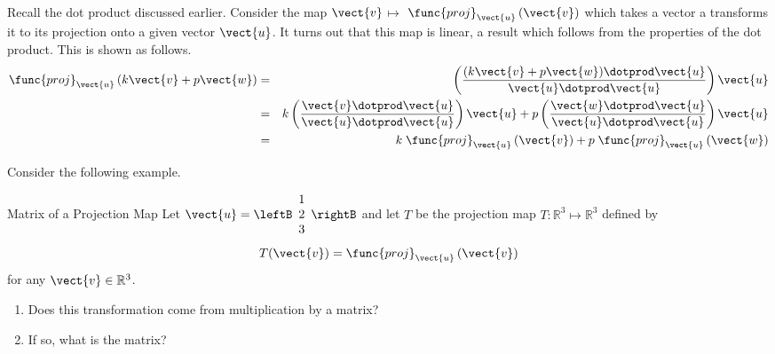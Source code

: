 Recall the dot product discussed earlier. Consider the map $\vect{v}$\textbf{$\mapsto $}
$\func{proj}_{\vect{u}}\left( \vect{v}\right) $ which takes a vector a transforms it to its projection onto a given vector $\vect{u}$. It turns out that
this map is linear, a result which follows from the properties of the
dot product. This is shown as follows.
\begin{eqnarray*}
\func{proj}_{\vect{u}}\left( k \vect{v}+ p \vect{w}\right)
&=&\left( \vspace{0.05in}\frac{(k \vect{v}+ p \vect{w})\dotprod \vect{u}}{
\vect{u}\dotprod \vect{u}}\right) \vect{u} \\
&=& k  \left( \vspace{0.05in}\frac{
\vect{v}\dotprod \vect{u}}{\vect{u}\dotprod \vect{u}}\right) \vect{u}+p \left( \vspace{
0.05in}\frac{\vect{w}\dotprod \vect{u}}{\vect{u}\dotprod \vect{u}}\right) \vect{u} \\
&=& k \; \func{proj}_{\vect{u}}\left( \vect{v}\right) +p \; \func{proj}
_{\vect{u}}\left( \vect{w}\right) 
\end{eqnarray*}

Consider the following example.

\begin{example}{Matrix of a Projection Map}\label{exa:projectionmatrix}
Let $\vect{u} = \leftB \begin{array}{r}
1 \\
2 \\
3
\end{array}
\rightB$ and let $T$ be the projection map $T: \mathbb{R}^3 \mapsto \mathbb{R}^3$ defined by 
\[
T(\vect{v}) = \func{proj}_{\vect{u}}\left( \vect{v}\right)
\]
for any $\vect{v} \in \mathbb{R}^3$.  
\begin{enumerate}
\item Does this transformation come from
multiplication by a matrix?
\item If so, what is the matrix?
\end{enumerate}
\end{example}


